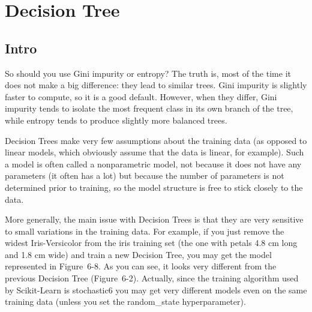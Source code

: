 \documentclass[]{book}
\theoremstyle{definition}
\theoremstyle{definition}
\theoremstyle{definition}
\theoremstyle{remark}
\begin{document}
\section{Decision Tree}\label{decision-tree}

\subsection{Intro}\label{intro-13}

So should you use Gini impurity or entropy? The truth is, most of the
time it does not make a big difference: they lead to similar trees. Gini
impurity is slightly faster to compute, so it is a good default.
However, when they differ, Gini impurity tends to isolate the most
frequent class in its own branch of the tree, while entropy tends to
produce slightly more balanced trees.

Decision Trees make very few assumptions about the training data (as
opposed to linear models, which obviously assume that the data is
linear, for example). Such a model is often called a nonparametric
model, not because it does not have any parameters (it often has a lot)
but because the number of parameters is not determined prior to
training, so the model structure is free to stick closely to the data.

More generally, the main issue with Decision Trees is that they are very
sensitive to small variations in the training data. For example, if you
just remove the widest Iris-Versicolor from the iris training set (the
one with petals 4.8 cm long and 1.8 cm wide) and train a new Decision
Tree, you may get the model represented in Figure~6-8. As you can see,
it looks very different from the previous Decision Tree (Figure~6-2).
Actually, since the training algorithm used by Scikit-Learn is
stochastic6 you may get very different models even on the same training
data (unless you set the random\_state hyperparameter).
\end{document}
